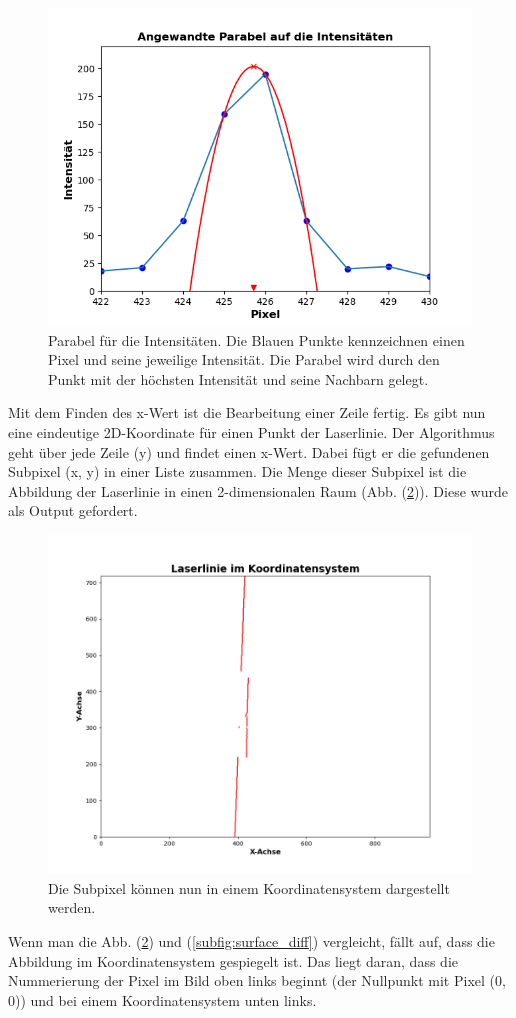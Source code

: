 	\begin{figure}[h]
		\centering
		\includegraphics[width=0.7\linewidth]{img/hauptteil/bildverarbeitung/parable_intensities.png}
		\caption[Angewandte Parabel auf die Intensitäten]{Parabel für die Intensitäten. Die Blauen Punkte kennzeichnen einen Pixel und seine jeweilige Intensität. Die Parabel wird durch den Punkt mit der höchsten Intensität und seine Nachbarn gelegt.}
		\label{fig:parable}
	\end{figure} 
	
	Mit dem Finden des x-Wert ist die Bearbeitung einer Zeile fertig. Es gibt nun eine eindeutige 2D-Koordinate für einen Punkt der Laserlinie. Der Algorithmus geht über jede Zeile (y) und findet einen x-Wert. Dabei fügt er die gefundenen Subpixel (x, y) in einer Liste zusammen. Die Menge dieser Subpixel ist die Abbildung der Laserlinie in einen 2-dimensionalen Raum (Abb. (\ref{fig:pix_koord})). Diese wurde als Output gefordert.
	
	\begin{figure}[h]
		\centering
		\includegraphics[width=0.8\linewidth]{img/hauptteil/bildverarbeitung/pixel_koord.png}
		\caption[Subpixel im Koordinatensystem]{Die Subpixel können nun in einem Koordinatensystem dargestellt werden.}
		\label{fig:pix_koord}
	\end{figure} 

	Wenn man die Abb. (\ref{fig:pix_koord}) und (\ref{subfig:surface_diff}) vergleicht, fällt auf, dass die Abbildung im Koordinatensystem gespiegelt ist. Das liegt daran, dass die Nummerierung der Pixel im Bild oben links beginnt (der Nullpunkt mit Pixel (0, 0)) und bei einem Koordinatensystem unten links. 

	\label{chap:erkennen_der_laserlinie}
